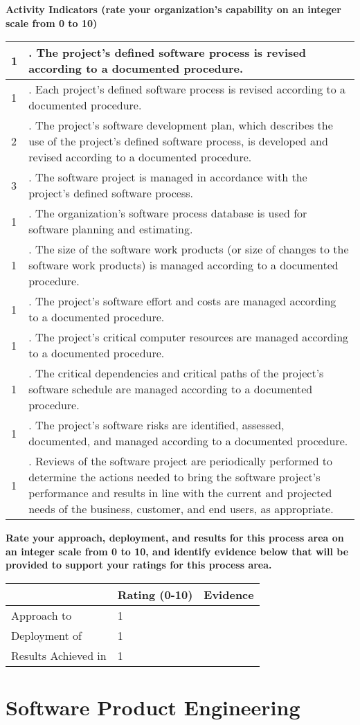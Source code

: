 \documentclass{article}
\newcommand{\KPAname}{}
\let\KPAsection=\section
\renewcommand{\section}[1]{\renewcommand{\KPAname}{#1}\KPAsection{#1}}
\newcounter{activity}		%
\newenvironment{KPAActivity}
{
    \setcounter{activity}{0} %
    {\bf Activity Indicators (rate your organization's capability
    on an integer scale from 0 to 10)} %
    \begin{center}
    \begin{tabular}{|p{0.5in}|p{6.0in}|} \hline %
}
{
    \end{tabular}
    \end{center}
}
\newcommand{\Activity}[2]
{
    \stepcounter{activity} #1 & \arabic{activity}. #2 \\ \hline
} %
\newenvironment{KPARate}
{
    {\bf Rate your approach, deployment, and results for
    this process area on an integer scale from 0 to 10, and 
    identify evidence below that will be provided to support your
    ratings for this process area.}
    \begin{center}
    \begin{tabular}{|p{1.0in}|p{0.5in}|p{5.0in}|} \hline
    & Rating (0-10) & \multicolumn{1}{c|}{Evidence} \\ \hline
}
{
    \end{tabular}
    \end{center}
}
\newcommand{\Approach}[2]{Approach to \KPAname & #1 & #2 \\ \hline}
\newcommand{\Deployment}[2]{Deployment of \KPAname & #1 & #2 \\ \hline}
\newcommand{\Results}[2]{Results Achieved in \KPAname & #1 & #2 \\
	\hline}
\begin{document}
\begin{KPAActivity}
\Activity{1}{The project's defined software process is revised
according to a documented procedure.}
\Activity{1}{Each project's defined software process is revised
according to a documented procedure.}
\Activity{2}{The project's software development plan, which describes
the use of the project's defined software process, is developed and
revised according to a documented procedure.}
\Activity{3}{The software project is managed in accordance with the
project's defined software process.}
\Activity{1}{The organization's software process database is used for
software planning and estimating.}
\Activity{1}{The size of the software work products (or size of changes
to the software work products) is managed according to a documented
procedure.}
\Activity{1}{The project's software effort and costs are managed
according to a documented procedure.}
\Activity{1}{The project's critical computer resources are managed
according to a documented procedure.}
\Activity{1}{The critical dependencies and critical paths of the
project's software schedule are managed according to a documented
procedure.}
\Activity{1}{The project's software risks are identified, assessed,
documented, and managed according to a documented procedure.}
\Activity{1}{Reviews of the software project are periodically performed
to determine the actions needed to bring the software project's
performance and results in line with the current and projected needs
of the business, customer, and end users, as appropriate.}
\end{KPAActivity}

\begin{KPARate}
\Approach{1}{}
\Deployment{1}{}
\Results{1}{}
\end{KPARate}

\newpage
\section{Software Product Engineering}
\end{document}
